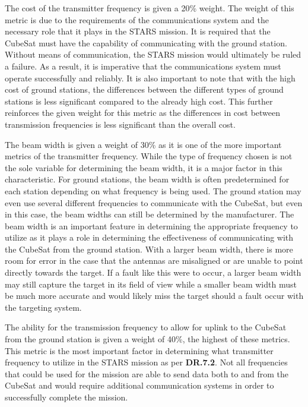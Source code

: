 The cost of the transmitter frequency is given a 20\% weight. The weight of this metric is due to the requirements of the communications system and the necessary role that it plays in the STARS mission. It is required that the CubeSat must have the capability of communicating with the ground station. Without means of communication, the STARS mission would ultimately be ruled a failure. As a result, it is imperative that the communications system must operate successfully and reliably. It is also important to note that with the high cost of ground stations, the differences between the different types of ground stations is less significant compared to the already high cost. This further reinforces the given weight for this metric as the differences in cost between transmission frequencies is less significant than the overall cost. 

The beam width is given a weight of 30\% as it is one of the more important metrics of the transmitter frequency. While the type of frequency chosen is not the sole variable for determining the beam width, it is a major factor in this characteristic. For ground stations, the beam width is often predetermined for each station depending on what frequency is being used. The ground station may even use several different frequencies to communicate with the CubeSat, but even in this case, the beam widths can still be determined by the manufacturer. The beam width is an important feature in determining the appropriate frequency to utilize as it plays a role in determining the effectiveness of communicating with the CubeSat from the ground station. With a larger beam width, there is more room for error in the case that the antennas are misaligned or are unable to point directly towards the target. If a fault like this were to occur, a larger beam width may still capture the target in its field of view while a smaller beam width must be much more accurate and would likely miss the target should a fault occur with the targeting system. 

The ability for the transmission frequency to allow for uplink to the CubeSat from the ground station is given a weight of 40\%, the highest of these metrics. This metric is the most important factor in determining what transmitter frequency to utilize in the STARS mission as per \textbf{DR.7.2}. Not all frequencies that could be used for the mission are able to send data both to and from the CubeSat and would require additional communication systems in order to successfully complete the mission. 

